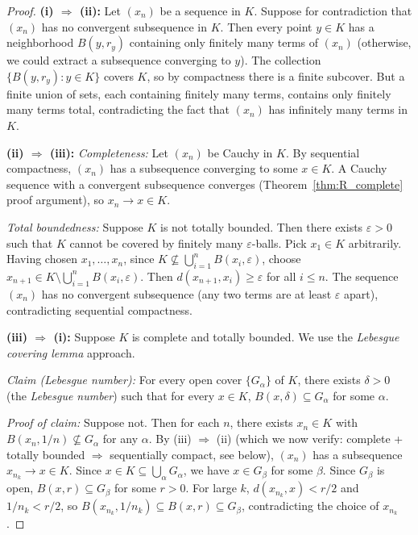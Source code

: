 \documentclass[11pt,a4paper]{article}
\theoremstyle{definition}
\theoremstyle{plain}
\theoremstyle{remark}
\begin{document}
\begin{proof}
\textbf{(i) $\Rightarrow$ (ii):}
Let $(x_n)$ be a sequence in $K$. Suppose for contradiction that $(x_n)$ has no
convergent subsequence in $K$. Then every point $y \in K$ has a neighborhood
$B(y, r_y)$ containing only finitely many terms of $(x_n)$ (otherwise, we could
extract a subsequence converging to $y$). The collection $\{B(y, r_y) : y \in K\}$
covers $K$, so by compactness there is a finite subcover. But a finite union of
sets, each containing finitely many terms, contains only finitely many terms total,
contradicting the fact that $(x_n)$ has infinitely many terms in $K$.

\textbf{(ii) $\Rightarrow$ (iii):}
\emph{Completeness:} Let $(x_n)$ be Cauchy in $K$. By sequential compactness,
$(x_n)$ has a subsequence converging to some $x \in K$. A Cauchy sequence with a
convergent subsequence converges (Theorem~\ref{thm:R_complete} proof argument), so
$x_n \to x \in K$.

\emph{Total boundedness:} Suppose $K$ is not totally bounded. Then there exists
$\varepsilon > 0$ such that $K$ cannot be covered by finitely many
$\varepsilon$-balls. Pick $x_1 \in K$ arbitrarily. Having chosen $x_1, \ldots, x_n$,
since $K \not\subseteq \bigcup_{i=1}^n B(x_i, \varepsilon)$, choose
$x_{n+1} \in K \setminus \bigcup_{i=1}^n B(x_i, \varepsilon)$. Then
$d(x_{n+1}, x_i) \ge \varepsilon$ for all $i \le n$. The sequence $(x_n)$ has no
convergent subsequence (any two terms are at least $\varepsilon$ apart),
contradicting sequential compactness.

\textbf{(iii) $\Rightarrow$ (i):}
Suppose $K$ is complete and totally bounded. We use the \emph{Lebesgue covering
lemma} approach.

\emph{Claim (Lebesgue number):} For every open cover $\{G_\alpha\}$ of $K$, there
exists $\delta > 0$ (the \emph{Lebesgue number}) such that for every $x \in K$,
$B(x, \delta) \subseteq G_\alpha$ for some $\alpha$.

\emph{Proof of claim:} Suppose not. Then for each $n$, there exists $x_n \in K$
with $B(x_n, 1/n) \not\subseteq G_\alpha$ for any $\alpha$. By (iii) $\Rightarrow$
(ii) (which we now verify: complete + totally bounded $\Rightarrow$ sequentially
compact, see below), $(x_n)$ has a subsequence $x_{n_k} \to x \in K$. Since
$x \in K \subseteq \bigcup_\alpha G_\alpha$, we have $x \in G_\beta$ for some
$\beta$. Since $G_\beta$ is open, $B(x, r) \subseteq G_\beta$ for some $r > 0$.
For large $k$, $d(x_{n_k}, x) < r/2$ and $1/n_k < r/2$, so
$B(x_{n_k}, 1/n_k) \subseteq B(x, r) \subseteq G_\beta$, contradicting the choice
of $x_{n_k}$.


\end{proof}
\end{document}
